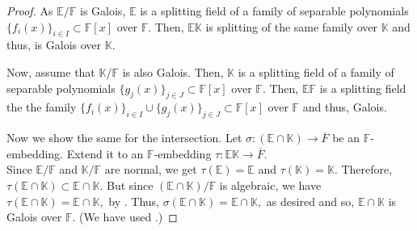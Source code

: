 \galoisEFK*\label{prop:galoisEFK2}
\begin{flushright}\hyperref[prop:galoisEFK]{\upsym}\end{flushright}
\begin{proof}
    As $\mathbb{E}/\mathbb{F}$ is Galois, $\mathbb{E}$ is a splitting field of a family of separable polynomials $\{f_i(x)\}_{i \in I} \subset \mathbb{F}[x]$ over $\mathbb{F}.$ Then, $\mathbb{E}\mathbb{K}$ is splitting of the same family over $\mathbb{K}$ and thus, is Galois over $\mathbb{K}.$

    Now, assume that $\mathbb{K}/\mathbb{F}$ is also Galois. Then, $\mathbb{K}$ is a splitting field of a family of separable polynomials $\{g_j(x)\}_{j \in J} \subset \mathbb{F}[x]$ over $\mathbb{F}.$ Then, $\mathbb{E}\mathbb{F}$ is a splitting field the the family $\{f_i(x)\}_{i \in I} \cup \{g_j(x)\}_{j \in J} \subset \mathbb{F}[x]$ over $\mathbb{F}$ and thus, Galois.

    Now we show the same for the intersection. Let $\sigma : (\mathbb{E} \cap \mathbb{K}) \to \overline{F}$ be an $\mathbb{F}$-embedding. Extend it to an $\mathbb{F}$-embedding $\tau : \mathbb{E}\mathbb{K} \to \overline{F}.$\\
    Since $\mathbb{E}/\mathbb{F}$ and $\mathbb{K}/\mathbb{F}$ are normal, we get $\tau(\mathbb{E}) = \mathbb{E}$ and $\tau(\mathbb{K}) = \mathbb{K}.$ Therefore, $\tau(\mathbb{E} \cap \mathbb{K}) \subset \mathbb{E} \cap \mathbb{K}.$ But since $(\mathbb{E} \cap \mathbb{K})/\mathbb{F}$ is algebraic, we have $\tau(\mathbb{E} \cap \mathbb{K}) = \mathbb{E} \cap \mathbb{K},$ by . Thus, $\sigma(\mathbb{E} \cap \mathbb{K}) = \mathbb{E} \cap \mathbb{K},$ as desired and so, $\mathbb{E} \cap \mathbb{K}$ is Galois over $\mathbb{F}.$ (We have used .)
\end{proof}

